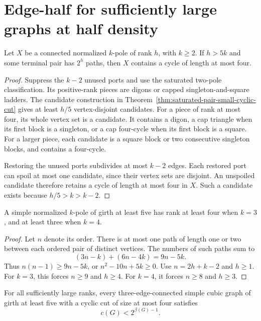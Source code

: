 \section{Edge-half for sufficiently large graphs at half density}
\label{sec:four-edge-half-dense-small-cuts}

\begin{lemma}\label{lem:four-full-pole-short-cycle}
Let $X$ be a connected normalized $k$-pole of rank $h$, with $k\ge2$.
If $h>5k$ and some terminal pair has $2^h$ paths, then $X$ contains a cycle of length at most four.
\end{lemma}

\begin{proof}
Suppress the $k-2$ unused ports and use the saturated two-pole classification.
Its positive-rank pieces are digons or capped singleton-and-square ladders.
The candidate construction in Theorem~\ref{thm:saturated-pair-small-cyclic-cut} gives at least $h/5$ vertex-disjoint candidates.
For a piece of rank at most four, its whole vertex set is a candidate.
It contains a digon, a cap triangle when its first block is a singleton, or a cap four-cycle when its first block is a square.
For a larger piece, each candidate is a square block or two consecutive singleton blocks, and contains a four-cycle.

Restoring the unused ports subdivides at most $k-2$ edges.
Each restored port can spoil at most one candidate, since their vertex sets are disjoint.
An unspoiled candidate therefore retains a cycle of length at most four in $X$.
Such a candidate exists because $h/5>k>k-2$.
\end{proof}

\begin{lemma}\label{lem:four-girth-five-small-pole-ranks}
A simple normalized $k$-pole of girth at least five has rank at least four when $k=3$, and at least three when $k=4$.
\end{lemma}

\begin{proof}
Let $n$ denote its order.
There is at most one path of length one or two between each ordered pair of distinct vertices.
The numbers of such paths sum to
\[
 (3n-k)+(6n-4k)=9n-5k.
\]
Thus $n(n-1)\ge9n-5k$, or $n^2-10n+5k\ge0$.
Use $n=2h+k-2$ and $h\ge1$.
For $k=3$, this forces $n\ge9$ and $h\ge4$.
For $k=4$, it forces $n\ge8$ and $h\ge3$.
\end{proof}

\begin{proposition}\label{prop:four-girth-five-small-cut-deficit}
For all sufficiently large ranks, every three-edge-connected simple cubic graph of girth at least five with a cyclic cut of size at most four satisfies
\[
 c(G)<2^{\beta(G)-1}.
\]
\end{proposition}

